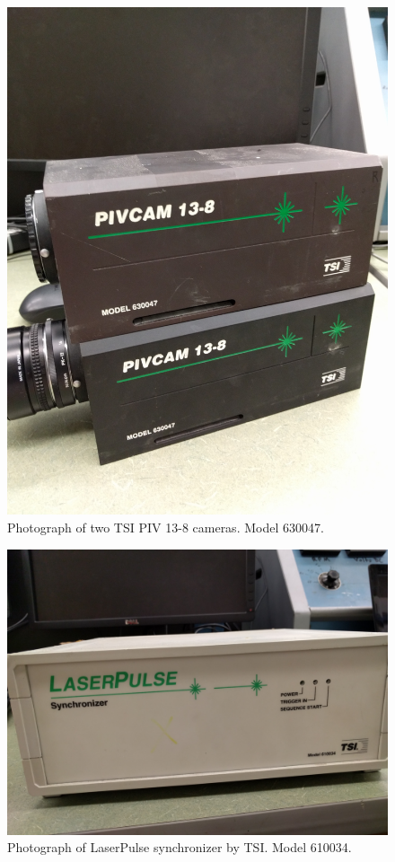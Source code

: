 \begin{figure}[H]
	\centering
	\includegraphics[width=5in]{figs/piv_method/piv_cams}
	\caption{Photograph of two TSI PIV 13-8 cameras. Model 630047.}
	\label{fig:camera_picture}
\end{figure}

\begin{figure}[H]
	\centering
	\includegraphics[width=5in]{figs/piv_method/synchronizer}
	\caption{Photograph of LaserPulse synchronizer by TSI. Model 610034.}
	\label{fig:synchronizer}
\end{figure}

